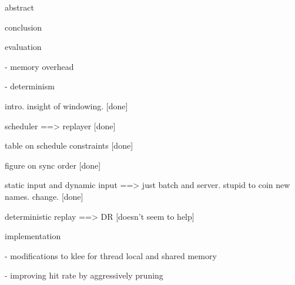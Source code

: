 abstract

conclusion

evaluation

  - memory overhead

  - determinism

intro.  insight of windowing.  [done] %

scheduler ==> replayer  [done]

table on schedule constraints [done]

figure on sync order [done]







static input and dynamic input  ==> just batch and server.  stupid to coin new names.  change.   [done]

deterministic replay ==> DR  [doesn't seem to help]

implementation

  - modifications to klee for thread local and shared memory

  - improving hit rate by aggressively pruning

